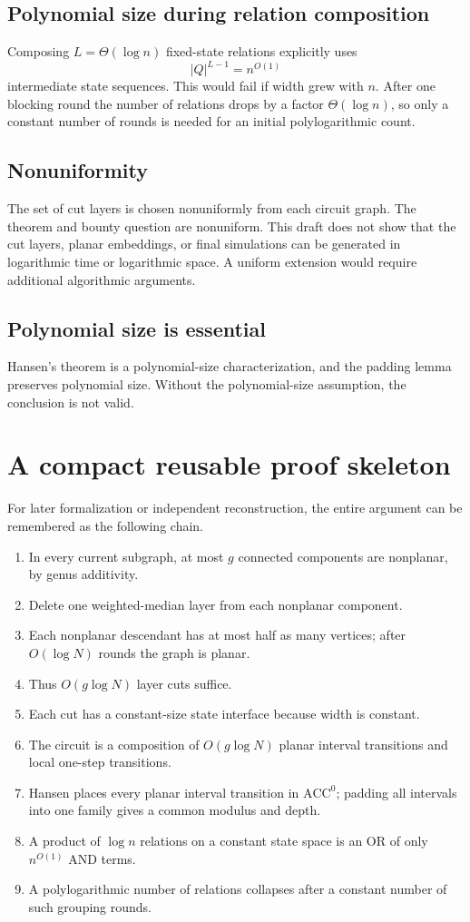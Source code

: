 \documentclass[11pt]{article}
\theoremstyle{definition}
\newcommand{\ACC}{\mathrm{ACC}^{0}}
\begin{document}
\subsection{Polynomial size during relation composition}
Composing $L=\Theta(\log n)$ fixed-state relations explicitly uses
\[
  |Q|^{L-1}=n^{O(1)}
\]
intermediate state sequences. This would fail if width grew with $n$. After one blocking round the number of relations drops by a factor $\Theta(\log n)$, so only a constant number of rounds is needed for an initial polylogarithmic count.

\subsection{Nonuniformity}
The set of cut layers is chosen nonuniformly from each circuit graph. The theorem and bounty question are nonuniform. This draft does not show that the cut layers, planar embeddings, or final simulations can be generated in logarithmic time or logarithmic space. A uniform extension would require additional algorithmic arguments.

\subsection{Polynomial size is essential}
Hansen's theorem is a polynomial-size characterization, and the padding lemma preserves polynomial size. Without the polynomial-size assumption, the conclusion is not valid.

\section{A compact reusable proof skeleton}

For later formalization or independent reconstruction, the entire argument can be remembered as the following chain.

\begin{enumerate}[leftmargin=2.2em]
\item In every current subgraph, at most $g$ connected components are nonplanar, by genus additivity.
\item Delete one weighted-median layer from each nonplanar component.
\item Each nonplanar descendant has at most half as many vertices; after $O(\log N)$ rounds the graph is planar.
\item Thus $O(g\log N)$ layer cuts suffice.
\item Each cut has a constant-size state interface because width is constant.
\item The circuit is a composition of $O(g\log N)$ planar interval transitions and local one-step transitions.
\item Hansen places every planar interval transition in $\ACC$; padding all intervals into one family gives a common modulus and depth.
\item A product of $\log n$ relations on a constant state space is an OR of only $n^{O(1)}$ AND terms.
\item A polylogarithmic number of relations collapses after a constant number of such grouping rounds.
\end{enumerate}
\end{document}
